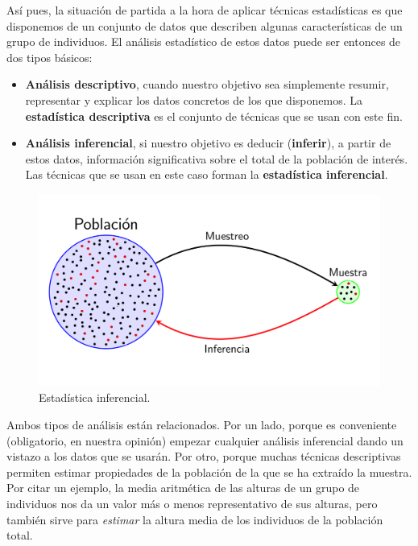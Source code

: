 \documentclass[
]{book}
\theoremstyle{definition}
\theoremstyle{definition}
\theoremstyle{definition}
\theoremstyle{definition}
\theoremstyle{remark}
\begin{document}
Así pues, la situación de partida a la hora de aplicar técnicas estadísticas es que disponemos de un conjunto de datos que describen algunas características de un grupo de individuos. El análisis estadístico de estos datos puede ser entonces de dos tipos básicos:

\begin{itemize}
\item
  \textbf{Análisis descriptivo}, cuando nuestro objetivo sea simplemente resumir, representar y explicar los datos concretos de los que disponemos. La \textbf{estadística descriptiva} es el conjunto de técnicas que se usan con este fin.
\item
  \textbf{Análisis inferencial}, si nuestro objetivo es deducir (\textbf{inferir}), a partir de estos datos, información significativa sobre el total de la población de interés. Las técnicas que se usan en este caso forman la \textbf{estadística inferencial}.
\end{itemize}

\begin{figure}

{\centering \includegraphics[width=0.8\linewidth]{INREMDN_files/figure-html/EstInf} 

}

\caption{Estadística inferencial.}\label{fig:estinf}
\end{figure}

Ambos tipos de análisis están relacionados. Por un lado, porque es conveniente (obligatorio, en nuestra opinión) empezar cualquier análisis inferencial dando un vistazo a los datos que se usarán. Por otro, porque muchas técnicas descriptivas permiten estimar propiedades de la población de la que se ha extraído la muestra. Por citar un ejemplo, la media aritmética de las alturas de un grupo de individuos nos da un valor más o menos representativo de sus alturas, pero también sirve para \emph{estimar} la altura media de los individuos de la población total.
\end{document}
